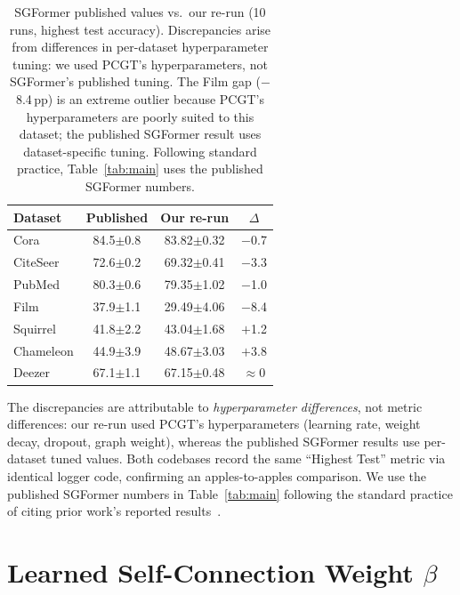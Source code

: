 \documentclass[sigconf]{acmart}
\begin{document}
\begin{table}[t]
\centering
\small
\begin{tabular}{l|cc|c}
\toprule
\textbf{Dataset} & \textbf{Published} & \textbf{Our re-run} & \textbf{$\Delta$} \\
\midrule
Cora       & 84.5{\scriptsize$\pm$0.8} & 83.82{\scriptsize$\pm$0.32} & $-$0.7 \\
CiteSeer   & 72.6{\scriptsize$\pm$0.2} & 69.32{\scriptsize$\pm$0.41} & $-$3.3 \\
PubMed     & 80.3{\scriptsize$\pm$0.6} & 79.35{\scriptsize$\pm$1.02} & $-$1.0 \\
Film       & 37.9{\scriptsize$\pm$1.1} & 29.49{\scriptsize$\pm$4.06} & $-$8.4 \\
Squirrel   & 41.8{\scriptsize$\pm$2.2} & 43.04{\scriptsize$\pm$1.68} & $+$1.2 \\
Chameleon  & 44.9{\scriptsize$\pm$3.9} & 48.67{\scriptsize$\pm$3.03} & $+$3.8 \\
Deezer     & 67.1{\scriptsize$\pm$1.1} & 67.15{\scriptsize$\pm$0.48} & $\approx$0 \\
\bottomrule
\end{tabular}
\caption{SGFormer published values vs.\ our re-run (10 runs, highest test accuracy). Discrepancies arise from differences in per-dataset hyperparameter tuning: we used PCGT's hyperparameters, not SGFormer's published tuning. The Film gap ($-$8.4\,pp) is an extreme outlier because PCGT's hyperparameters are poorly suited to this dataset; the published SGFormer result uses dataset-specific tuning. Following standard practice, Table~\ref{tab:main} uses the published SGFormer numbers.}
\label{tab:sgf_rerun}
\end{table}

\noindent The discrepancies are attributable to \emph{hyperparameter differences}, not metric differences: our re-run used PCGT's hyperparameters (learning rate, weight decay, dropout, graph weight), whereas the published SGFormer results use per-dataset tuned values. Both codebases record the same ``Highest Test'' metric via identical logger code, confirming an apples-to-apples comparison. We use the published SGFormer numbers in Table~\ref{tab:main} following the standard practice of citing prior work's reported results~\citep{wu2023difformer, chen2023nagphormer, wu2022nodeformer}.

\section{Learned Self-Connection Weight $\beta$}
\label{app:beta_prop}
\end{document}
